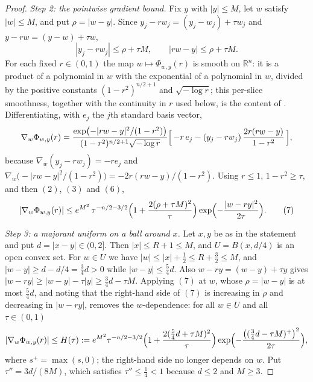 \begin{proof}
\emph{Step 2: the pointwise gradient bound.}
Fix $y$ with $|y| \leq M$, let $w$ satisfy $|w| \leq M$, and put $\rho = |w-y|$.
Since $y_j - rw_j = (y_j-w_j) + \tau w_j$ and $y - rw = (y-w) + \tau w$,
\begin{equation*}
  |y_j - rw_j| \leq \rho + \tau M, \qquad |rw - y| \leq \rho + \tau M . \tag{6}
\end{equation*}
For each fixed $r \in (0,1)$ the map $w \mapsto \Phi_{w,y}(r)$ is smooth on
$\mathbb{R}^n$: it is a product of a polynomial in $w$ with the exponential of a
polynomial in $w$, divided by the positive constants $(1-r^2)^{n/2+1}$ and
$\sqrt{-\log r}$; this per-slice smoothness, together with the continuity in $r$
used below, is the content of .
Differentiating, with $e_j$ the $j$th standard basis vector,
\[
  \nabla_w\Phi_{w,y}(r)
    = \frac{\exp\bigl(-|rw-y|^2/(1-r^2)\bigr)}{(1-r^2)^{n/2+1}\sqrt{-\log r}}
      \Bigl[\,-r\,e_j - (y_j - rw_j)\,\frac{2r(rw-y)}{1-r^2}\,\Bigr] ,
\]
because $\nabla_w(y_j-rw_j) = -re_j$ and
$\nabla_w\bigl(-|rw-y|^2/(1-r^2)\bigr) = -2r(rw-y)/(1-r^2)$.  Using
$r \leq 1$, $1-r^2 \geq \tau$, and then $(2)$, $(3)$ and $(6)$,
\begin{equation*}
  |\nabla_w\Phi_{w,y}(r)|
    \leq e^{M^2}\,\tau^{-n/2-3/2}\Bigl(1 + \frac{2(\rho+\tau M)^2}{\tau}\Bigr)
      \exp\Bigl(-\frac{|w-ry|^2}{2\tau}\Bigr) . \tag{7}
\end{equation*}

\emph{Step 3: a majorant uniform on a ball around $x$.}
Let $x,y$ be as in the statement and put $d = |x-y| \in (0,2]$.  Then
$|x| \leq R+1 \leq M$, and $U = B(x,d/4)$ is an open convex set.  For $w \in U$
we have $|w| \leq |x| + \tfrac12 \leq R + \tfrac32 \leq M$, and
$|w-y| \geq d - d/4 = \tfrac34 d > 0$ while $|w-y| \leq \tfrac54 d$.  Also
$w - ry = (w-y) + \tau y$ gives
$|w-ry| \geq |w-y| - \tau|y| \geq \tfrac34 d - \tau M$.  Applying $(7)$ at $w$,
whose $\rho = |w-y|$ is at most $\tfrac54 d$, and noting that the right-hand side
of $(7)$ is increasing in $\rho$ and decreasing in $|w-ry|$,
 removes the $w$-dependence:
for all $w \in U$ and all $\tau \in (0,1)$
\[
  |\nabla_w\Phi_{w,y}(r)| \leq H(\tau)
    := e^{M^2}\tau^{-n/2-3/2}
       \Bigl(1 + \frac{2(\tfrac54 d+\tau M)^2}{\tau}\Bigr)
       \exp\Bigl(-\frac{\bigl((\tfrac34 d - \tau M)^+\bigr)^2}{2\tau}\Bigr) ,
\]
where $s^+ = \max(s,0)$; the right-hand side no longer depends on $w$.  Put
$\tau'' = 3d/(8M)$, which satisfies $\tau'' \leq \tfrac14 < 1$ because $d \leq 2$
and $M \geq 3$.


\end{proof}
